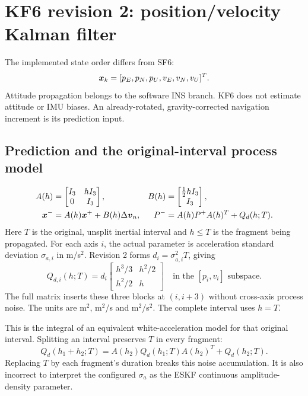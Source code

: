 \section{KF6 revision 2: position/velocity Kalman filter}
\label{sec:kf6}
The implemented state order differs from SF6:
\begin{equation}
\boldsymbol{x}_k=[p_E,p_N,p_U,v_E,v_N,v_U]^T.
\end{equation}
Attitude propagation belongs to the software INS branch. KF6 does not estimate attitude or IMU biases. An already-rotated, gravity-corrected navigation increment is its prediction input.

\subsection{Prediction and the original-interval process model}
\begin{align}
A(h)&=\begin{bmatrix}I_3&hI_3\\0&I_3\end{bmatrix},&
B(h)&=\begin{bmatrix}\tfrac12hI_3\\I_3\end{bmatrix},\\
\boldsymbol{x}^-&=A(h)\boldsymbol{x}^++B(h)\Delta\boldsymbol{v}_n,&
P^-&=A(h)P^+A(h)^T+Q_d(h;T).
\end{align}
Here $T$ is the original, unsplit inertial interval and $h\le T$ is the fragment being propagated. For each axis $i$, the actual parameter is acceleration standard deviation $\sigma_{a,i}$ in m/s$^2$. Revision 2 forms $d_i=\sigma_{a,i}^2T$, giving
\begin{equation}
Q_{d,i}(h;T)=d_i\begin{bmatrix}h^3/3&h^2/2\\h^2/2&h\end{bmatrix}
\quad\text{in the }[p_i,v_i]\text{ subspace}.
\label{eq:kf-q}
\end{equation}
The full matrix inserts these three blocks at $(i,i+3)$ without cross-axis process noise. The units are m$^2$, m$^2$/s and m$^2$/s$^2$. The complete interval uses $h=T$.

This is the integral of an equivalent white-acceleration model for that original interval. Splitting an interval preserves $T$ in every fragment:
\begin{equation}
Q_d(h_1+h_2;T)=A(h_2)Q_d(h_1;T)A(h_2)^T+Q_d(h_2;T).
\label{eq:kf-compose}
\end{equation}
Replacing $T$ by each fragment's duration breaks this noise accumulation. It is also incorrect to interpret the configured $\sigma_a$ as the ESKF continuous amplitude-density parameter.

